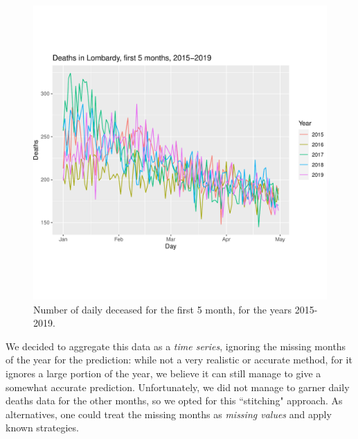 \documentclass[11pt,a4paper,final]{paper}
\begin{document}
\begin{figure}[h]
\includegraphics[width=\textwidth]{../images/lombardy_deaths_2015_2019.pdf}
\caption{Number of daily deceased for the first 5 month, for the years 2015-2019.}
\label{fig:lomb_death_2015_2019}
\end{figure}

We decided to aggregate this data as a \textit{time series}, ignoring the missing months of the year for the prediction: while not a very realistic or accurate method, for it ignores a large portion of the year, we believe it can still manage to give a somewhat accurate prediction. Unfortunately, we did not manage to garner daily deaths data for the other months, so we opted for this ``stitching" approach. As alternatives, one could treat the missing months as \textit{missing values} and apply known strategies.\cite{missing_values}
\end{document}
